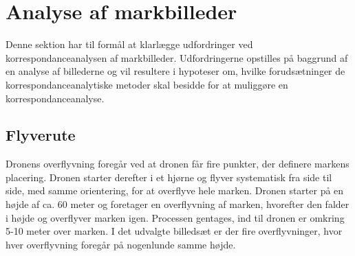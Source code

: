 \chapter{Analyse af markbilleder} \label{sec:mark}
Denne sektion har til formål at klarlægge udfordringer ved korrespondanceanalysen af markbilleder. Udfordringerne opstilles på baggrund af en analyse af billederne og vil resultere i hypoteser om, hvilke forudsætninger de korrespondanceanalytiske metoder skal besidde for at muliggøre en korrespondanceanalyse.
\section{Flyverute}
Dronens overflyvning foregår ved at dronen får fire punkter, der definere markens placering. Dronen starter derefter i et hjørne og flyver systematisk fra side til side, med samme orientering, for at overflyve hele marken. Dronen starter på en højde af ca. 60 meter og foretager en overflyvning af marken, hvorefter den falder i højde og overflyver marken igen. Processen gentages, ind til dronen er omkring 5-10 meter over marken. I det udvalgte billedsæt er der fire overflyvninger, hvor hver overflyvning foregår på nogenlunde samme højde.
